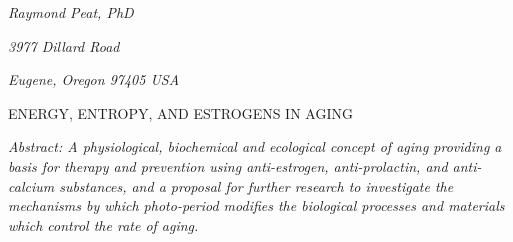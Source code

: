 \documentclass[10pt]{memoir}
\begin{document}
\noindent\textit{Raymond Peat, PhD}

\noindent\textit{3977 Dillard Road}

\noindent\textit{Eugene, Oregon 97405 USA}

\medskip

\begin{center}
	{
		\Large%
		{\pragmatica ENERGY, ENTROPY, AND ESTROGENS IN AGING}
	}

	\bigskip

	\parbox{0.9\textwidth}{%
		\textit{Abstract: A physiological, biochemical and ecological concept of aging providing a basis\linebreak
			for therapy and prevention using anti-estrogen, anti-prolactin, and anti-calcium substances,\linebreak
			and a proposal for further research to investigate the mechanisms by which photo-period\linebreak
			modifies the biological processes and materials which control the rate of aging.}
	}
\end{center}

\medskip
\end{document}
